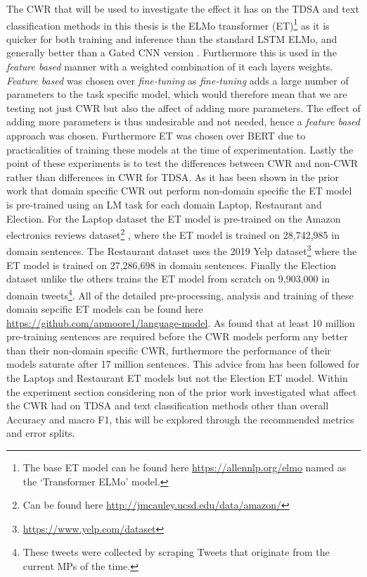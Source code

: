 The CWR that will be used to investigate the effect it has on the TDSA and text classification methods in this thesis is the ELMo transformer (ET)\footnote{The base ET model can be found here \url{https://allennlp.org/elmo} named as the `Transformer ELMo' model.} as it is quicker for both training and inference than the standard LSTM ELMo, and generally better than a Gated CNN version \citep{vectors_peters-etal-2018-dissecting}. Furthermore this is used in the \textit{feature based} manner with a weighted combination of it each layers weights. \textit{Feature based} was chosen over \textit{fine-tuning} as \textit{fine-tuning} adds a large number of parameters to the task specific model, which would therefore mean that we are testing not just CWR but also the affect of adding more parameters. The effect of adding more parameters is thus undesirable and not needed, hence a \textit{feature based} approach was chosen. Furthermore ET was chosen over BERT due to practicalities of training these models at the time of experimentation. Lastly the point of these experiments is to test the differences between CWR and non-CWR rather than differences in CWR for TDSA. As it has been shown in the prior work that domain specific CWR out perform non-domain specific the ET model is pre-trained using an LM task for each domain Laptop, Restaurant and Election. For the Laptop dataset the ET model is pre-trained on the Amazon electronics reviews dataset\footnote{Can be found here \url{http://jmcauley.ucsd.edu/data/amazon/}} \citep{mcauley2015image}, where the ET model is trained on 28,742,985 in domain sentences. The Restaurant dataset uses the 2019 Yelp dataset\footnote{\url{https://www.yelp.com/dataset}} where the ET model is trained on 27,286,698 in domain sentences. Finally the Election dataset unlike the others trains the ET model from scratch on 9,903,000 in domain tweets\footnote{These tweets were collected by scraping Tweets that originate from the current MPs of the time.}. All of the detailed pre-processing, analysis and training of these domain sepcific ET models can be found here \url{https://github.com/apmoore1/language-model}. As \citet{cwr_tdsa_models_rietzler2019adapt} found that at least 10 million pre-training sentences are required before the CWR models perform any better than their non-domain specific CWR, furthermore the performance of their models saturate after 17 million sentences. This advice from \citet{cwr_tdsa_models_rietzler2019adapt} has been followed for the Laptop and Restaurant ET models but not the Election ET model. Within the experiment section considering non of the prior work investigated what affect the CWR had on TDSA and text classification methods other than overall Accuracy and macro F1, this will be explored through the recommended metrics and error splits. 

